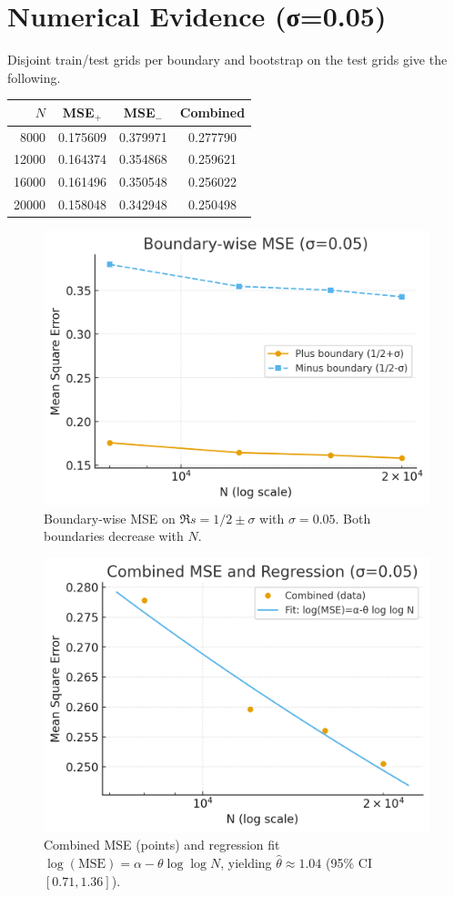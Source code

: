 \documentclass[11pt]{article}
\theoremstyle{remark}
\begin{document}
\section{Numerical Evidence (σ=0.05)}
Disjoint train/test grids per boundary and bootstrap on the test grids give the following.
\begin{center}
\begin{tabular}{@{}rccc@{}}
\toprule
$N$ & MSE$_+$ & MSE$_-$ & Combined \\
\midrule
8000  & 0.175609 & 0.379971 & 0.277790 \\
12000 & 0.164374 & 0.354868 & 0.259621 \\
16000 & 0.161496 & 0.350548 & 0.256022 \\
20000 & 0.158048 & 0.342948 & 0.250498 \\
\bottomrule
\end{tabular}
\end{center}

\begin{figure}[h]
\centering
\includegraphics[width=.8\linewidth]{figures/boundary_mse_sigma005.png}
\caption{Boundary-wise MSE on $\Re s=1/2\pm\sigma$ with $\sigma=0.05$. Both boundaries decrease with $N$.}
\end{figure}

\begin{figure}[h]
\centering
\includegraphics[width=.8\linewidth]{figures/combined_mse_fit_sigma005.png}
\caption{Combined MSE (points) and regression fit $\log(\mathrm{MSE})=\alpha-\theta\log\log N$, yielding $\hat\theta\approx 1.04$ (95\% CI $[0.71,1.36]$).}
\end{figure}
\end{document}
